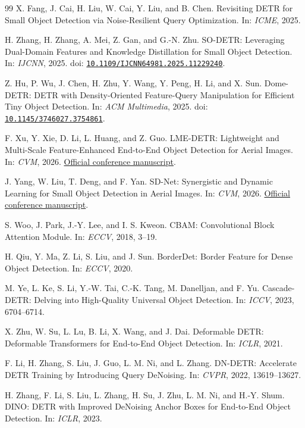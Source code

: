 \begin{thebibliography}{99}
 X. Fang, J. Cai, H. Liu, W. Cai, Y. Liu, and B. Chen. Revisiting DETR for Small Object Detection via Noise-Resilient Query Optimization. In: \emph{ICME}, 2025.

 H. Zhang, H. Zhang, A. Mei, Z. Gan, and G.-N. Zhu. SO-DETR: Leveraging Dual-Domain Features and Knowledge Distillation for Small Object Detection. In: \emph{IJCNN}, 2025. doi: \href{https://doi.org/10.1109/IJCNN64981.2025.11229240}{\nolinkurl{10.1109/IJCNN64981.2025.11229240}}.

 Z. Hu, P. Wu, J. Chen, H. Zhu, Y. Wang, Y. Peng, H. Li, and X. Sun. Dome-DETR: DETR with Density-Oriented Feature-Query Manipulation for Efficient Tiny Object Detection. In: \emph{ACM Multimedia}, 2025. doi: \href{https://doi.org/10.1145/3746027.3754861}{\nolinkurl{10.1145/3746027.3754861}}.

 F. Xu, Y. Xie, D. Li, L. Huang, and Z. Guo. LME-DETR: Lightweight and Multi-Scale Feature-Enhanced End-to-End Object Detection for Aerial Images. In: \emph{CVM}, 2026. \href{https://iccvm.org/2026/files/papers/265.pdf}{Official conference manuscript}.

 J. Yang, W. Liu, T. Deng, and F. Yan. SD-Net: Synergistic and Dynamic Learning for Small Object Detection in Aerial Images. In: \emph{CVM}, 2026. \href{https://iccvm.org/2026/files/papers/691.pdf}{Official conference manuscript}.

 S. Woo, J. Park, J.-Y. Lee, and I. S. Kweon. CBAM: Convolutional Block Attention Module. In: \emph{ECCV}, 2018, 3--19.

 H. Qiu, Y. Ma, Z. Li, S. Liu, and J. Sun. BorderDet: Border Feature for Dense Object Detection. In: \emph{ECCV}, 2020.

 M. Ye, L. Ke, S. Li, Y.-W. Tai, C.-K. Tang, M. Danelljan, and F. Yu. Cascade-DETR: Delving into High-Quality Universal Object Detection. In: \emph{ICCV}, 2023, 6704--6714.

 X. Zhu, W. Su, L. Lu, B. Li, X. Wang, and J. Dai. Deformable DETR: Deformable Transformers for End-to-End Object Detection. In: \emph{ICLR}, 2021.

 F. Li, H. Zhang, S. Liu, J. Guo, L. M. Ni, and L. Zhang. DN-DETR: Accelerate DETR Training by Introducing Query DeNoising. In: \emph{CVPR}, 2022, 13619--13627.

 H. Zhang, F. Li, S. Liu, L. Zhang, H. Su, J. Zhu, L. M. Ni, and H.-Y. Shum. DINO: DETR with Improved DeNoising Anchor Boxes for End-to-End Object Detection. In: \emph{ICLR}, 2023.


\end{thebibliography}
